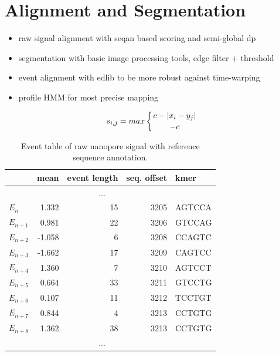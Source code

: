\section{Alignment and Segmentation}
\label{sec:signal:alignment}

\begin{itemize}
	\item raw signal alignment with seqan based scoring and semi-global dp
	\item segmentation with basic image processing tools, edge filter + threshold
	\item event alignment with edlib to be more robust against time-warping
	\item profile HMM for most precise mapping
\end{itemize}

\begin{equation}
s_{i,j} = max \left\lbrace c - \left| x_{i} - y_{j} \right| \atop -c \right.
\end{equation}

\begin{table}[ht]
	\centering
	\caption[Event detection and annotation]{Event table of raw nanopore signal with reference sequence annotation.}
	\label{tab:signal:events}
	\begin{tabular}{l|r|r|r|l}
		 & mean & event length & seq. offset & kmer \\
		\hline 
		& \multicolumn{3}{c|}{...} &  \\
		\hline
		$ E_{n} $ &  1.332  & 15 & 3205 & AGTCCA \\
		\rowcolor{LightOrange}
		$ E_{n+1} $ &  0.981  & 22 & 3206 & GTCCAG \\
		$ E_{n+2} $ & -1.058  &  6 & 3208 & CCAGTC \\
		$ E_{n+3} $ & -1.662  & 17 & 3209 & CAGTCC \\
		$ E_{n+4} $ &  1.360  &  7 & 3210 & AGTCCT \\
		$ E_{n+5} $ &  0.664  & 33 & 3211 & GTCCTG \\
		$ E_{n+6} $ &  0.107  & 11 & 3212 & TCCTGT \\
		\rowcolor{LightGreen}
		$ E_{n+7} $ &  0.844  &  4 & 3213 & CCTGTG \\
		\rowcolor{LightGreen}
		$ E_{n+8} $ &  1.362  & 38 & 3213 & CCTGTG \\
		\hline
		& \multicolumn{3}{c|}{...} &  \\
	\end{tabular} 
\end{table}


